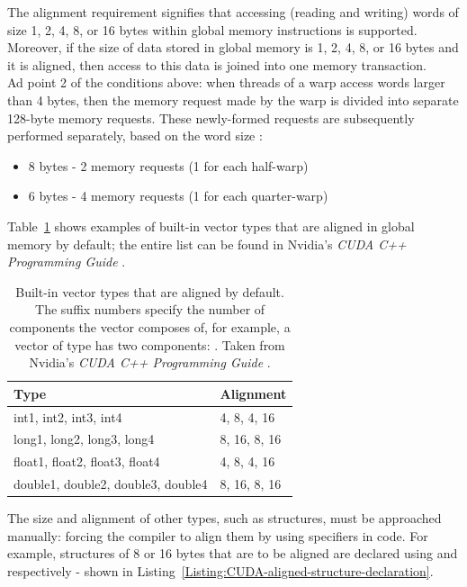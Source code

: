 The alignment requirement signifies that accessing (reading and writing) words of size 1, 2, 4, 8, or 16 bytes within global memory instructions is supported. Moreover, if the size of data stored in global memory is 1, 2, 4, 8, or 16 bytes and it is aligned, then access to this data is joined into one memory transaction. \\
Ad point 2 of the conditions above: when threads of a warp access words larger than 4 bytes, then the memory request made by the warp is divided into separate 128-byte memory requests. These newly-formed requests are subsequently performed separately, based on the word size \cite{NVIDIAMay2022}:

\begin{itemize}
	\item 8 bytes - 2 memory requests (1 for each half-warp)
	\item 6 bytes - 4 memory requests (1 for each quarter-warp)
\end{itemize}

Table~\ref{Table:CUDA-built-in-aligned-vector-types} shows examples of built-in vector types that are aligned in global memory by default; the entire list can be found in Nvidia's \emph{CUDA C++ Programming Guide} \cite{NVIDIAMay2022}.

\begin{table}[h!]
	\centering
	\renewcommand{\arraystretch}{1.5}
	\begin{tabular}{ |l|l| } 
		\hline
		\textbf{Type} & \textbf{Alignment} \\
		\hline
		int1, int2, int3, int4 & 4, 8, 4, 16 \\
		long1, long2, long3, long4 & 8, 16, 8, 16 \\
		float1, float2, float3, float4 & 4, 8, 4, 16 \\
		double1, double2, double3, double4 & 8, 16, 8, 16 \\
		\hline
	\end{tabular}
	\caption{Built-in vector types that are aligned by default. The suffix numbers specify the number of components the vector composes of, for example, a vector of type  has two components: . Taken from Nvidia's \emph{CUDA C++ Programming Guide} \cite{NVIDIAMay2022}.}
	\label{Table:CUDA-built-in-aligned-vector-types}
\end{table}

The size and alignment of other types, such as structures, must be approached manually: forcing the compiler to align them by using specifiers in code. For example, structures of 8 or 16 bytes that are to be aligned are declared using  and  respectively - shown in Listing~\ref{Listing:CUDA-aligned-structure-declaration}.

